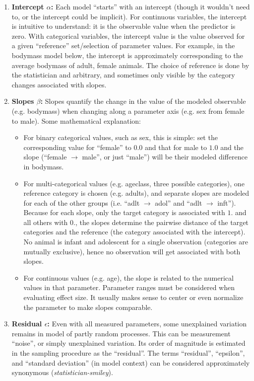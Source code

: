 \begin{enumerate}
\item \textbf{Intercept \(\alpha\):}
\label{sec:org034f04c}
Each model ``starts'' with an intercept (though it wouldn't need to, or the intercept could be implicit).
For continuous variables, the intercept is intuitive to understand: it is the observable value when the predictor is zero.
With categorical variables, the intercept value is the value observed for a given ``reference'' set/selection of parameter values.
For example, in the bodymass model below, the intercept is approximately corresponding to the average bodymass of adult, female animals.
The choice of reference is done by the statistician and arbitrary, and sometimes only visible by the category changes associated with slopes.

\item \textbf{Slopes \(\beta\):}
\label{sec:org2c291e4}
Slopes quantify the change in the value of the modeled observable (e.g. bodymass) when changing along a parameter axis (e.g. sex from female to male).
Some mathematical explanation:
\begin{itemize}
\item For binary categorical values, such as sex, this is simple: set the corresponding value for ``female'' to \(0.0\) and that for male to \(1.0\) and the slope (``female \(\rightarrow\) male'', or just ``male'') will be their modeled difference in bodymass.
\item For multi-categorical values (e.g. ageclass, three possible categories), one reference category is chosen (e.g. adults), and separate slopes are modeled for each of the other groups (i.e. ``adlt \(\rightarrow\) adol'' and ``adlt \(\rightarrow\) inft''). Because for each slope, only the target category is associated with \(1.\) and all others with \(0.\), the slopes determine the pairwise distance of the target categories and the reference (the category associated with the intercept). No animal is infant and adolescent for a single observation (categories are mutually exclusive), hence no observation will get associated with both slopes.
\item For continuous values (e.g. age), the slope is related to the numerical values in that parameter. Parameter ranges must be considered when evaluating effect size. It usually makes sense to center or even normalize the parameter to make slopes comparable.
\end{itemize}

\item \textbf{Residual \(\epsilon\):}
\label{sec:orgbf53734}
Even with all measured parameters, some unexplained variation remains in model of partly random processes.
This can be measurement ``noise'', or simply unexplained variation.
Its order of magnitude is estimated in the sampling procedure as the ``residual''.
The terms ``residual'', ``epsilon'', and ``standard deviation'' (in model context) can be considered approximately synonymous (\emph{statistician-smiley}).


\end{enumerate}

